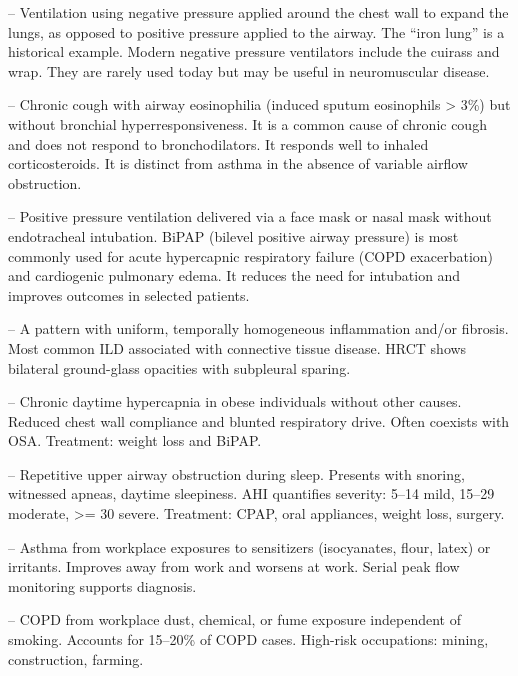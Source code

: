 -- Ventilation using negative pressure applied around the chest wall to expand the lungs, as opposed to positive pressure applied to the airway. The ``iron lung'' is a historical example. Modern negative pressure ventilators include the cuirass and wrap. They are rarely used today but may be useful in neuromuscular disease.

-- Chronic cough with airway eosinophilia (induced sputum eosinophils > 3\%) but without bronchial hyperresponsiveness. It is a common cause of chronic cough and does not respond to bronchodilators. It responds well to inhaled corticosteroids. It is distinct from asthma in the absence of variable airflow obstruction.

-- Positive pressure ventilation delivered via a face mask or nasal mask without endotracheal intubation. BiPAP (bilevel positive airway pressure) is most commonly used for acute hypercapnic respiratory failure (COPD exacerbation) and cardiogenic pulmonary edema. It reduces the need for intubation and improves outcomes in selected patients.

-- A pattern with uniform, temporally homogeneous inflammation and/or fibrosis. Most common ILD associated with connective tissue disease. HRCT shows bilateral ground-glass opacities with subpleural sparing.

-- Chronic daytime hypercapnia in obese individuals without other causes. Reduced chest wall compliance and blunted respiratory drive. Often coexists with OSA. Treatment: weight loss and BiPAP.

-- Repetitive upper airway obstruction during sleep. Presents with snoring, witnessed apneas, daytime sleepiness. AHI quantifies severity: 5--14 mild, 15--29 moderate, >= 30 severe. Treatment: CPAP, oral appliances, weight loss, surgery.

-- Asthma from workplace exposures to sensitizers (isocyanates, flour, latex) or irritants. Improves away from work and worsens at work. Serial peak flow monitoring supports diagnosis.

-- COPD from workplace dust, chemical, or fume exposure independent of smoking. Accounts for 15--20\% of COPD cases. High-risk occupations: mining, construction, farming.

